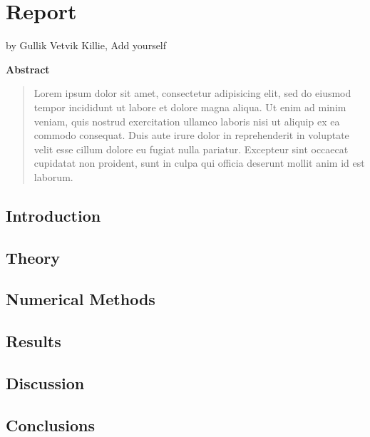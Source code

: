 \documentclass[captions=tableheading,twoside]{scrbook}
\newcommand{\agfauthor}[1]{%
	\begin{center}by #1\end{center}}
\newenvironment{Abstract}{\begin{center}\textbf{Abstract}\end{center}%
	\begin{quote}}{\end{quote}}
\begin{document}
\chapter{Report}
\agfauthor{Gullik Vetvik Killie, \large{Add yourself}}

\begin{Abstract}
	Lorem ipsum dolor sit amet, consectetur adipisicing elit, sed do eiusmod
	tempor incididunt ut labore et dolore magna aliqua. Ut enim ad minim veniam,
	quis nostrud exercitation ullamco laboris nisi ut aliquip ex ea commodo consequat.
 	Duis aute irure dolor in reprehenderit in voluptate velit esse cillum dolore eu
	fugiat nulla pariatur. Excepteur sint occaecat cupidatat non proident, sunt in
	culpa qui officia deserunt mollit anim id est laborum.
\end{Abstract}

\section{Introduction}


\section{Theory}


\section{Numerical Methods}


\section{Results}


\section{Discussion}



\section{Conclusions}



\nocite{*}
% 
\end{document}
